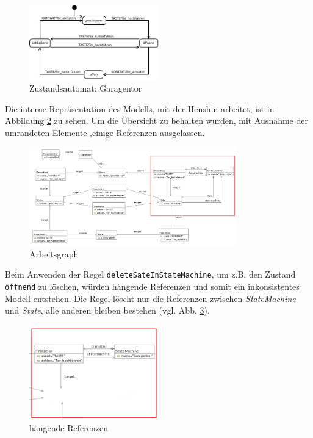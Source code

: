 \documentclass[a4paper]{scrartcl}
\begin{document}
\begin{figure}[H]
\centering
\includegraphics[width=0.5\textwidth]{graphics/statemachine-garagedoor.jpg}
\caption{Zustandsautomat: Garagentor}
\label{statemachine_garagedoor}
\end{figure}

Die interne Repräsentation des Modells, mit der Henshin arbeitet, ist in Abbildung \ref{henshin_workinggraph_garagedoor} zu sehen. 
Um die Übersicht zu behalten wurden, mit Ausnahme der umrandeten Elemente ,einige Referenzen ausgelassen.  

\begin{figure}[H]
\centering
\includegraphics[width=0.8\textwidth]{graphics/henshin-workinggraph_garagedoor.png}
\caption{Arbeitsgraph}
\label{henshin_workinggraph_garagedoor}
\end{figure}

Beim Anwenden der Regel \texttt{deleteSateInStateMachine}, um z.B. den Zustand \texttt{öffnend} zu löschen, würden hängende Referenzen und somit ein inkonsistentes Modell entstehen. Die Regel löscht nur die Referenzen zwischen \textit{StateMachine} und \textit{State}, alle anderen bleiben bestehen (vgl. Abb. \ref{henshin_workinggraph_garagedoor_danglingEdges}). 

\begin{figure}[H]
\centering
\includegraphics[width=0.5\textwidth]{graphics/henshin-workinggraph_garagedoor_danglingEdges.png}
\caption{hängende Referenzen}
\label{henshin_workinggraph_garagedoor_danglingEdges}
\end{figure}
\end{document}
